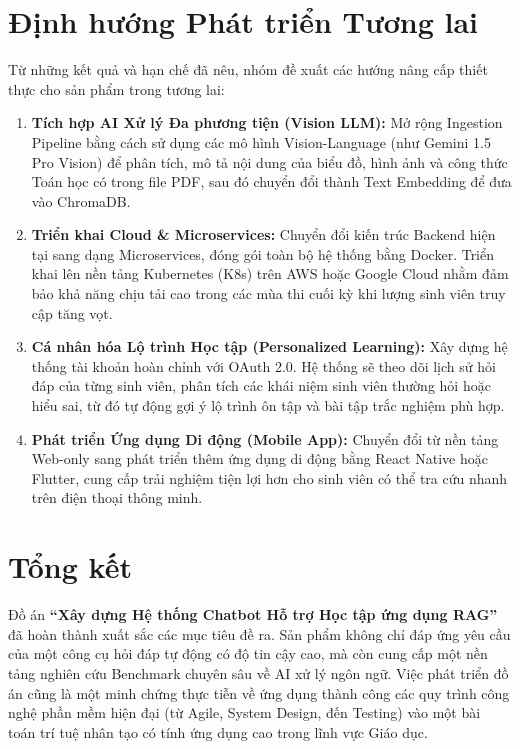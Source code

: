 \section{Định hướng Phát triển Tương lai}

Từ những kết quả và hạn chế đã nêu, nhóm đề xuất các hướng nâng cấp thiết thực cho sản phẩm trong tương lai:

\begin{enumerate}[label=\textbf{\arabic*.}, leftmargin=*, itemsep=4pt]
  \item \textbf{Tích hợp AI Xử lý Đa phương tiện (Vision LLM):} Mở rộng Ingestion Pipeline bằng cách sử dụng các mô hình Vision-Language (như Gemini 1.5 Pro Vision) để phân tích, mô tả nội dung của biểu đồ, hình ảnh và công thức Toán học có trong file PDF, sau đó chuyển đổi thành Text Embedding để đưa vào ChromaDB.
  
  \item \textbf{Triển khai Cloud \& Microservices:} Chuyển đổi kiến trúc Backend hiện tại sang dạng Microservices, đóng gói toàn bộ hệ thống bằng Docker. Triển khai lên nền tảng Kubernetes (K8s) trên AWS hoặc Google Cloud nhằm đảm bảo khả năng chịu tải cao trong các mùa thi cuối kỳ khi lượng sinh viên truy cập tăng vọt.
  
  \item \textbf{Cá nhân hóa Lộ trình Học tập (Personalized Learning):} Xây dựng hệ thống tài khoản hoàn chỉnh với OAuth 2.0. Hệ thống sẽ theo dõi lịch sử hỏi đáp của từng sinh viên, phân tích các khái niệm sinh viên thường hỏi hoặc hiểu sai, từ đó tự động gợi ý lộ trình ôn tập và bài tập trắc nghiệm phù hợp.
  
  \item \textbf{Phát triển Ứng dụng Di động (Mobile App):} Chuyển đổi từ nền tảng Web-only sang phát triển thêm ứng dụng di động bằng React Native hoặc Flutter, cung cấp trải nghiệm tiện lợi hơn cho sinh viên có thể tra cứu nhanh trên điện thoại thông minh.
\end{enumerate}

\section{Tổng kết}

Đồ án \textbf{``Xây dựng Hệ thống Chatbot Hỗ trợ Học tập ứng dụng RAG''} đã hoàn thành xuất sắc các mục tiêu đề ra. Sản phẩm không chỉ đáp ứng yêu cầu của một công cụ hỏi đáp tự động có độ tin cậy cao, mà còn cung cấp một nền tảng nghiên cứu Benchmark chuyên sâu về AI xử lý ngôn ngữ. Việc phát triển đồ án cũng là một minh chứng thực tiễn về ứng dụng thành công các quy trình công nghệ phần mềm hiện đại (từ Agile, System Design, đến Testing) vào một bài toán trí tuệ nhân tạo có tính ứng dụng cao trong lĩnh vực Giáo dục.
